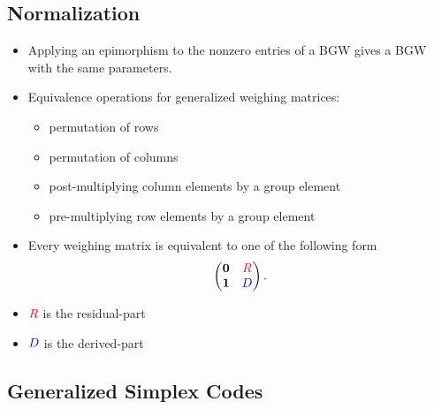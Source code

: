 \documentclass{beamer}
\newcommand{\rred}[1]{\textcolor{red}{#1}}
\newcommand{\bblue}[1]{\textcolor{blue}{#1}}
\begin{document}

\subsection{Normalization}

\begin{frame}

  \begin{itemize}
  \item Applying an epimorphism to the nonzero entries of a BGW gives a BGW with
    the same parameters.
  \item Equivalence operations for generalized weighing matrices:
    \begin{itemize}
    \item permutation of rows
    \item permutation of columns
    \item post-multiplying column elements by a group element
    \item pre-multiplying row elements by a group element
    \end{itemize}
  \item Every weighing matrix is equivalent to one of the following form
    \[
      \begin{pmatrix}
        \textbf{0} & \rred{R} \\
        \textbf{1} & \bblue{D}
      \end{pmatrix}.
    \]
  \item $\rred{R}$ is the residual-part
  \item $\bblue{D}$ is the derived-part
  \end{itemize}
  
\end{frame}


\subsection{Generalized Simplex Codes}
\end{document}
